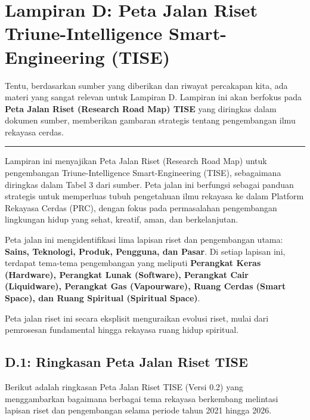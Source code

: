\documentclass[
  letterpaper,
  DIV=11,
  numbers=noendperiod]{scrreprt}
\begin{document}
\chapter{\texorpdfstring{\textbf{Lampiran D: Peta Jalan Riset
Triune-Intelligence Smart-Engineering
(TISE)}}{Lampiran D: Peta Jalan Riset Triune-Intelligence Smart-Engineering (TISE)}}\label{lampiran-d-peta-jalan-riset-triune-intelligence-smart-engineering-tise-1}

Tentu, berdasarkan sumber yang diberikan dan riwayat percakapan kita,
ada materi yang sangat relevan untuk Lampiran D. Lampiran ini akan
berfokus pada \textbf{Peta Jalan Riset (Research Road Map) TISE} yang
diringkas dalam dokumen sumber, memberikan gambaran strategis tentang
pengembangan ilmu rekayasa cerdas.

\begin{center}\rule{0.5\linewidth}{0.5pt}\end{center}

Lampiran ini menyajikan Peta Jalan Riset (Research Road Map) untuk
pengembangan Triune-Intelligence Smart-Engineering (TISE), sebagaimana
diringkas dalam Tabel 3 dari sumber. Peta jalan ini berfungsi sebagai
panduan strategis untuk memperluas tubuh pengetahuan ilmu rekayasa ke
dalam Platform Rekayasa Cerdas (PRC), dengan fokus pada permasalahan
pengembangan lingkungan hidup yang sehat, kreatif, aman, dan
berkelanjutan.

Peta jalan ini mengidentifikasi lima lapisan riset dan pengembangan
utama: \textbf{Sains, Teknologi, Produk, Pengguna, dan Pasar}. Di setiap
lapisan ini, terdapat tema-tema pengembangan yang meliputi
\textbf{Perangkat Keras (Hardware), Perangkat Lunak (Software),
Perangkat Cair (Liquidware), Perangkat Gas (Vapourware), Ruang Cerdas
(Smart Space), dan Ruang Spiritual (Spiritual Space)}.

Peta jalan riset ini secara eksplisit menguraikan evolusi riset, mulai
dari pemrosesan fundamental hingga rekayasa ruang hidup spiritual.

\section{\texorpdfstring{\textbf{D.1: Ringkasan Peta Jalan Riset
TISE}}{D.1: Ringkasan Peta Jalan Riset TISE}}\label{d.1-ringkasan-peta-jalan-riset-tise-1}

Berikut adalah ringkasan Peta Jalan Riset TISE (Versi 0.2) yang
menggambarkan bagaimana berbagai tema rekayasa berkembang melintasi
lapisan riset dan pengembangan selama periode tahun 2021 hingga 2026.
\end{document}
